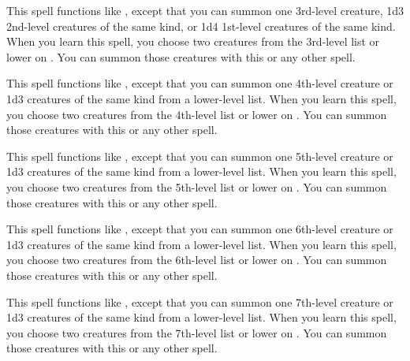 \spelleffect This spell functions like , except that you can summon one 3rd-level creature, 1d3 2nd-level creatures of the same kind, or 1d4 1st-level creatures of the same kind. When you learn this spell, you choose two creatures from the 3rd-level list or lower on . You can summon those creatures with this or any other  spell.

\spelleffect This spell functions like , except that you can summon one 4th-level creature or 1d3 creatures of the same kind from a lower-level list. When you learn this spell, you choose two creatures from the 4th-level list or lower on . You can summon those creatures with this or any other  spell.

\spelleffect This spell functions like , except that you can summon one 5th-level creature or 1d3 creatures of the same kind from a lower-level list. When you learn this spell, you choose two creatures from the 5th-level list or lower on . You can summon those creatures with this or any other  spell.

\spelleffect This spell functions like , except that you can summon one 6th-level creature or 1d3 creatures of the same kind from a lower-level list. When you learn this spell, you choose two creatures from the 6th-level list or lower on . You can summon those creatures with this or any other  spell.

\spelleffect This spell functions like , except that you can summon one 7th-level creature or 1d3 creatures of the same kind from a lower-level list. When you learn this spell, you choose two creatures from the 7th-level list or lower on . You can summon those creatures with this or any other  spell.

